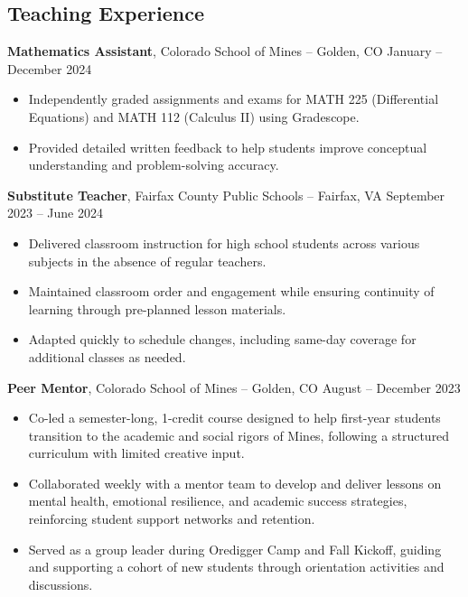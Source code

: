 \documentclass[11pt]{article}       %
\begin{document}
\subsection*{Teaching Experience}
\vspace{3pt}

\textbf{Mathematics Assistant}, Colorado School of Mines -- Golden, CO \hfill January -- December 2024
\vspace{-6pt}
\begin{itemize}
  \item Independently graded assignments and exams for MATH 225 (Differential Equations) and MATH 112 (Calculus II) using Gradescope.
  \item Provided detailed written feedback to help students improve conceptual understanding and problem-solving accuracy.
\end{itemize}

\textbf{Substitute Teacher}, Fairfax County Public Schools -- Fairfax, VA \hfill September 2023 -- June 2024
\vspace{-6pt}
\begin{itemize}
  \item Delivered classroom instruction for high school students across various subjects in the absence of regular teachers.
  \item Maintained classroom order and engagement while ensuring continuity of learning through pre-planned lesson materials.
  \item Adapted quickly to schedule changes, including same-day coverage for additional classes as needed.
\end{itemize}

\textbf{Peer Mentor}, Colorado School of Mines -- Golden, CO \hfill August -- December 2023
\vspace{-6pt}
\begin{itemize}
  \item Co-led a semester-long, 1-credit course designed to help first-year students transition to the academic and social rigors of Mines, following a structured curriculum with limited creative input.
  \item Collaborated weekly with a mentor team to develop and deliver lessons on mental health, emotional resilience, and academic success strategies, reinforcing student support networks and retention.
  \item Served as a group leader during Oredigger Camp and Fall Kickoff, guiding and supporting a cohort of new students through orientation activities and discussions.
\end{itemize}
\end{document}
